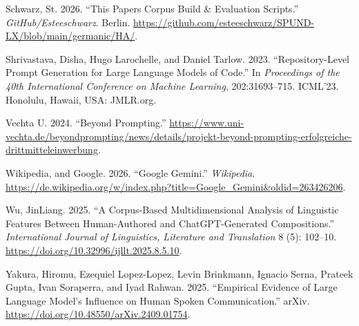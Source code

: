 \documentclass[
  letterpaper,
  DIV=11,
  numbers=noendperiod]{scrartcl}
\newlength{\cslhangindent}
\newenvironment{CSLReferences}[2] %
 {\begin{list}{}{%
  \setlength{\itemindent}{0pt}
  \setlength{\leftmargin}{0pt}
  \setlength{\parsep}{0pt}
  \ifodd #1
   \setlength{\leftmargin}{\cslhangindent}
   \setlength{\itemindent}{-1\cslhangindent}
  \fi
  \setlength{\itemsep}{#2\baselineskip}}}
 {\end{list}}
\begin{document}
\begin{CSLReferences}{1}{0}
Schwarz, St. 2026. {``This Papers Corpus Build \& Evaluation Scripts.''}
\emph{GitHub/Esteeschwarz}. Berlin.
\url{https://github.com/esteeschwarz/SPUND-LX/blob/main/germanic/HA/}.

Shrivastava, Disha, Hugo Larochelle, and Daniel Tarlow. 2023.
{``Repository-Level Prompt Generation for Large Language Models of
Code.''} In \emph{Proceedings of the 40th {International} {Conference}
on {Machine} {Learning}}, 202:31693--715. {ICML}'23. Honolulu, Hawaii,
USA: JMLR.org.

Vechta U. 2024. {``Beyond {Prompting}.''}
\url{https://www.uni-vechta.de/beyondprompting/news/details/projekt-beyond-prompting-erfolgreiche-drittmitteleinwerbung}.

Wikipedia, and Google. 2026. {``Google {Gemini}.''} \emph{Wikipedia}.
\url{https://de.wikipedia.org/w/index.php?title=Google_Gemini&oldid=263426206}.

Wu, JinLiang. 2025. {``A {Corpus}-{Based} {Multidimensional} {Analysis}
of {Linguistic} {Features} Between {Human}-{Authored} and
{ChatGPT}-{Generated} {Compositions}.''} \emph{International Journal of
Linguistics, Literature and Translation} 8 (5): 102--10.
\url{https://doi.org/10.32996/ijllt.2025.8.5.10}.

Yakura, Hiromu, Ezequiel Lopez-Lopez, Levin Brinkmann, Ignacio Serna,
Prateek Gupta, Ivan Soraperra, and Iyad Rahwan. 2025. {``Empirical
Evidence of {Large} {Language} {Model}'s Influence on Human Spoken
Communication.''} arXiv.
\url{https://doi.org/10.48550/arXiv.2409.01754}.

\end{CSLReferences}
\end{document}
